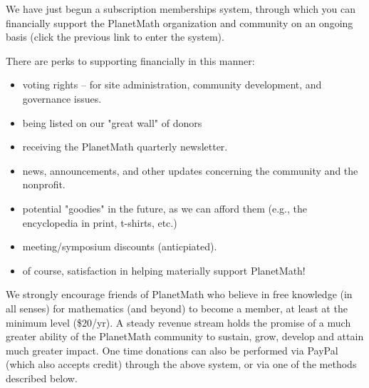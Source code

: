 
We have just begun a subscription memberships system, through which you can
financially support the PlanetMath organization and community on an ongoing
basis (click the previous link to enter the system).

There are perks to supporting financially in this manner:
\begin{itemize}
\item voting rights -- for site administration, community development, and
      governance issues.
\item being listed on our "great wall" of donors
\item receiving the PlanetMath quarterly newsletter.
\item news, announcements, and other updates concerning the community and the
      nonprofit.
\item potential "goodies" in the future, as we can afford them (e.g., the
      encyclopedia in print, t-shirts, etc.)
\item meeting/symposium discounts (anticpiated).
\item of course, satisfaction in helping materially support PlanetMath!
\end{itemize}
We strongly encourage friends of PlanetMath who believe in free knowledge (in
all senses) for mathematics (and beyond) to become a member, at least at the
minimum level (\$20/yr). A steady revenue stream holds the promise of a much
greater ability of the PlanetMath community to sustain, grow, develop and
attain much greater impact.
One time donations can also be performed via PayPal (which also accepts credit)
through the above system, or via one of the methods described below.
